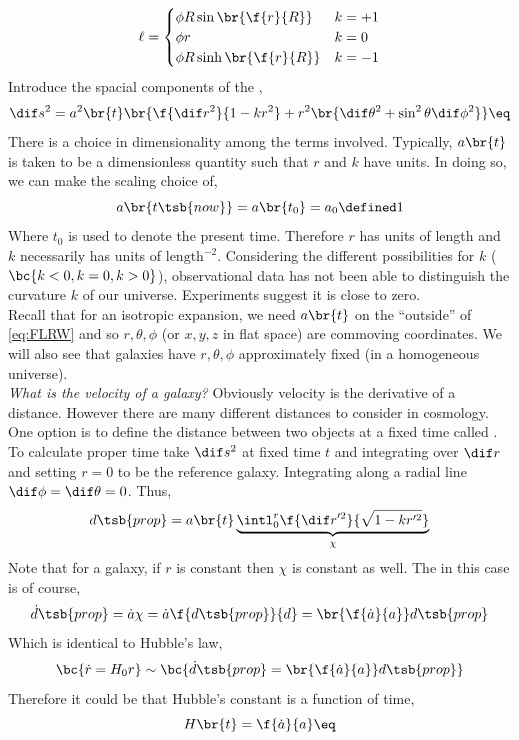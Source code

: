 \documentclass{article}
\begin{document}
\[ \ell = \begin{cases}
    \phi R \sin\br{\f{r}{R}} & k = +1 \\
    \phi r & k = 0 \\
    \phi R \sinh\br{\f{r}{R}} & k = -1 \\
\end{cases} \]
Introduce the spacial components of the ,
\[ \dif s^2 = a^2\br{t}\br{\f{\dif r^2}{1 - kr^2} + r^2 \br{\dif \theta^2 + \sin^2 \theta \dif \phi^2}} \eq \label{eq:FLRW}\]
There is a choice in dimensionality among the terms involved. Typically, $a\br{t}$ is taken to be a dimensionless quantity such that $r$ and $k$ have units. In doing so, we can make the scaling choice of,
\[ a\br{t\tsb{now}} = a\br{t_0} = a_0 \defined 1 \]
Where $t_0$ is used to denote the present time. Therefore $r$ has units of length and $k$ necessarily has units of $\text{length}^{-2}$. Considering the different possibilities for $k$ ($\bc{k < 0, k = 0, k > 0}$), observational data has not been able to distinguish the curvature $k$ of our universe. Experiments suggest it is close to zero. \\

Recall that for an isotropic expansion, we need $a\br{t}$ on the ``outside'' of \cref{eq:FLRW} and so $r,\theta,\phi$ (or $x,y,z$ in flat space) are commoving coordinates. We will also see that galaxies have $r, \theta, \phi$ approximately fixed (in a homogeneous universe).\\

\textit{What is the velocity of a galaxy?} Obviously velocity is the derivative of a distance. However there are many different distances to consider in cosmology. One option is to define the distance between two objects at a fixed time called . To calculate proper time take $\dif s^2$ at fixed time $t$ and integrating over $\dif r$ and setting $r=0$ to be the reference galaxy. Integrating along a radial line $\dif \phi = \dif \theta = 0$. Thus,
\[ d\tsb{prop} = a\br{t} \underbrace{\intl_{0}^{r} \f{\dif r'^2}{\sqrt{1 - k r'^2}}}_{\chi} \]
Note that for a galaxy, if $r$ is constant then $\chi$ is constant as well.
The  in this case is of course,
\[ \dot d\tsb{prop} = \dot a \chi = \dot a \f{d\tsb{prop}}{d} = \br{\f{\dot a}{a}} d\tsb{prop} \]
Which is identical to Hubble's law,
\[ \bc{\dot r = H_0 r} \sim \bc{\dot d\tsb{prop} = \br{\f{\dot a}{a}} d\tsb{prop}}  \]
Therefore it could be that Hubble's constant is a function of time,
\[ H\br{t} = \f{\dot a}{a} \eq \label{eq:hubble_scale_factor} \]
\end{document}

